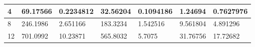 \begin{table}[]
\begin{tabular}{|l|l|l|l|l|l|l|}
4                                                                                   & 69.17566                                                                                                                    & 0.2234812                                                                                                                                       & 32.56204                                                                                                                                        & 0.1094186                                                                                                                                        & 1.24694                                                                                                                                      & 0.7627976                                                                                                                                      \\ \hline
8                                                                                   & 246.1986                                                                                                                    & 2.651166                                                                                                                                        & 183.3234                                                                                                                                        & 1.542516                                                                                                                                         & 9.561804                                                                                                                                     & 4.891296                                                                                                                                       \\ \hline
12                                                                                  & 701.0992                                                                                                                    & 10.23871                                                                                                                                        & 565.8032                                                                                                                                        & 5.7075                                                                                                                                           & 31.76756                                                                                                                                     & 17.72682                                                                                                                                       \\ \hline

\end{tabular}
\end{table}
